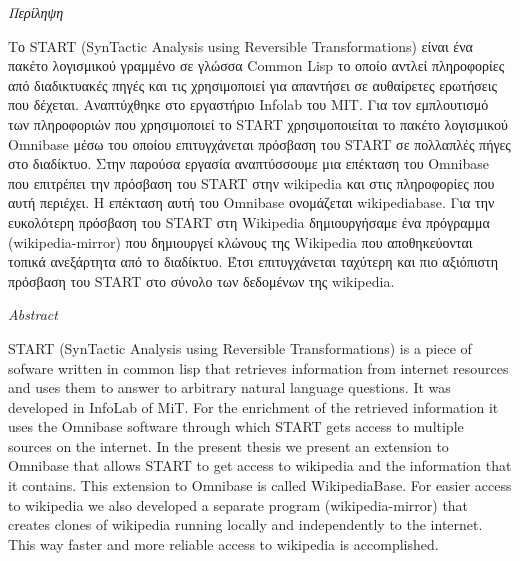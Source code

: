 {  \begin{center}
    \begin{Large}
      \textit{Περίληψη}
    \end{Large}
  \end{center}


  Το START (SynTactic Analysis using Reversible Transformations) είναι
  ένα πακέτο λογισμικού γραμμένο σε γλώσσα Common Lisp το οποίο αντλεί
  πληροφορίες από διαδικτυακές πηγές και τις χρησιμοποιεί για
  απαντήσει σε αυθαίρετες ερωτήσεις που δέχεται. Αναπτύχθηκε στο
  εργαστήριο Infolab του MIT. Για τον εμπλουτισμό των πληροφοριών που
  χρησιμοποιεί το START χρησιμοποιείται το πακέτο λογισμικού Omnibase
  μέσω του οποίου επιτυγχάνεται πρόσβαση του START σε πολλαπλές πήγες
  στο διαδίκτυο. Στην παρούσα εργασία αναπτύσσουμε μια επέκταση του
  Omnibase που επιτρέπει την πρόσβαση του START στην wikipedia και
  στις πληροφορίες που αυτή περιέχει. Η επέκταση αυτή του Omnibase
  ονομάζεται wikipediabase.  Για την ευκολότερη πρόσβαση του START στη
  Wikipedia δημιουργήσαμε ένα πρόγραμμα (wikipedia-mirror) που
  δημιουργεί κλώνους της Wikipedia που αποθηκεύονται τοπικά ανεξάρτητα
  από το διαδίκτυο.  Έτσι επιτυγχάνεται ταχύτερη και πιο αξιόπιστη
  πρόσβαση του START στο σύνολο των δεδομένων της wikipedia.

  \vspace*{1in}
  \begin{center}
    \begin{Large}
      \textit{Abstract}
    \end{Large}
  \end{center}

  START (SynTactic Analysis using Reversible Transformations) is a
  piece of sofware written in common lisp that retrieves information
  from internet resources and uses them to answer to arbitrary natural
  language questions. It was developed in InfoLab of MiT. For the
  enrichment of the retrieved information it uses the Omnibase
  software through which START gets access to multiple sources on the
  internet. In the present thesis we present an extension to Omnibase
  that allows START to get access to wikipedia and the information
  that it contains. This extension to Omnibase is called
  WikipediaBase. For easier access to wikipedia we also developed a
  separate program (wikipedia-mirror) that creates clones of wikipedia
  running locally and independently to the internet. This way faster
  and more reliable access to wikipedia is accomplished.

}
